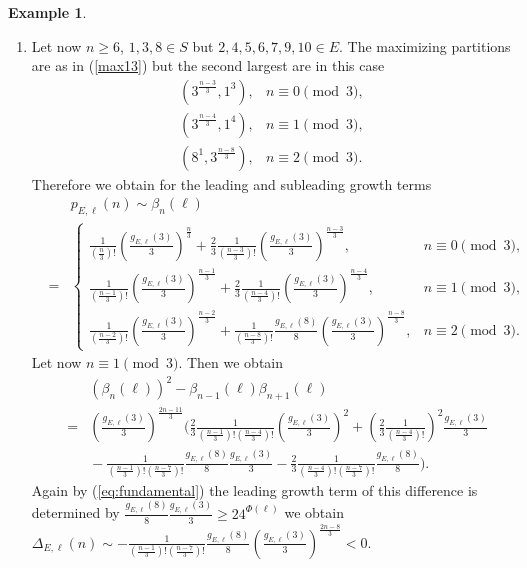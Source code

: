 \documentclass[12pt]{amsart}
\theoremstyle{definition}
\newtheorem{example}{Example}
\theoremstyle{remark}
\numberwithin{theorem}{section} \numberwithin{equation}{section}
\begin{document}
\begin{example}
\begin{enumerate}
\item  Let now $n\geq6$, $1,3,8\in S$ but $2,4,5,6,7,9,10\in E$. The maximizing partitions
are as in (\ref{max13}) but the second largest are in this case
\[
\begin{array}{rl}
\left( 3^{\frac{n-3}{3}},1^{3}\right) , & n\equiv 0\pmod{3}, \\
\left( 3^{\frac{n-4}{3}},1^{4}\right) , & n\equiv 1\pmod{3}, \\
\left( 8^{1},3^{\frac{n-8}{3}}\right) , & n\equiv 2\pmod{3}.
\end{array}
\]
Therefore we obtain for the leading and subleading growth terms
\begin{eqnarray*}
&&p_{E,\ell }\left( n\right) \sim \beta _{n}\left( \ell \right) \\ &=&\left\{
\begin{array}{ll}
\frac{1}{\left( \frac{n}{3}\right) !}
\left( \frac{g_{E,\ell }\left( 3\right) }{3}\right) ^{\frac{n}{3}}
+\frac{2}{3}\frac{1}{\left( \frac{n-3}{3}\right) !}
\left( \frac{g_{E,\ell }\left( 3\right) }{3}\right) ^{\frac{n-3}{3}},
&n\equiv 0\pmod{3},\\
\frac{1}{\left( \frac{n-1}{3}\right) !}
\left( \frac{g_{E,\ell }\left( 3\right) }{3}\right) ^{\frac{n-1}{3}}
+\frac{2}{3}\frac{1}{\left( \frac{n-4}{3}\right) !}
\left( \frac{g_{E,\ell }\left( 3\right) }{3}\right) ^{\frac{n-4}{3}},
&n\equiv 1\pmod{3},\\
\frac{1}{\left( \frac{n-2}{3}\right) !}
\left( \frac{g_{E,\ell }\left( 3\right) }{3}\right) ^{\frac{n-2}{3}}
+\frac{1}{\left( \frac{n-8}{3}\right) !}\frac{g_{E,\ell }\left( 8\right) }{8}
\left( \frac{g_{E,\ell }\left( 3\right) }{3}\right) ^{\frac{n-8}{3}},
&n\equiv 2\pmod{3}.
\end{array}
\right.
\end{eqnarray*}
Let now $n\equiv 1\pmod{3}$. Then we obtain
\begin{eqnarray*}
&&\left( \beta _{n}\left( \ell \right) \right) ^{2}
-\beta _{n-1}\left( \ell \right) \beta _{n+1}\left( \ell \right) \\
&=&\left( \frac{g_{E,\ell }\left( 3\right) }{3}\right) ^{\frac{2n-11}{3}}
( \frac{2}{3}
\frac{1}{\left( \frac{n-1}{3}\right) !
\left( \frac{n-4}{3}\right) !}
\left( \frac{g_{E,\ell }\left( 3\right) }{3}\right) ^{2}
+\left( \frac{2}{3}\frac{1}{\left( \frac{n-4}{3}\right) !}\right) ^{2}
\frac{g_{E,\ell }\left( 3\right) }{3}\\
&&{}-\frac{1}{\left( \frac{n-1}{3}\right) !\left( \frac{n-7}{3}\right) !}
\frac{g_{E,\ell }\left( 8\right) }{8}\frac{g_{E,\ell }\left( 3\right) }{3}
-\frac{2}{3}
\frac{1}{\left( \frac{n-4}{3}\right) !\left( \frac{n-7}{3}\right) !}
\frac{g_{E,\ell }\left( 8\right) }{8}
).
\end{eqnarray*}
Again by (\ref{eq:fundamental}) the leading growth term of this difference is determined by
$\frac{g_{E,\ell }\left( 8\right) }{8}\frac{g_{E,\ell }\left( 3\right) }{3}
\geq 24^{\Phi \left( \ell \right) }$
we obtain
$\Delta _{E,\ell }\left( n\right) \sim
-\frac{1}{\left( \frac{n-1}{3}\right) !\left( \frac{n-7}{3}\right) !}
\frac{g_{E,\ell }\left( 8\right) }{8}\left(
\frac{g_{E,\ell }\left( 3\right) }{3}\right) ^{\frac{2n-8}{3}}
<0$.



\end{enumerate}
\end{example}
\end{document}
